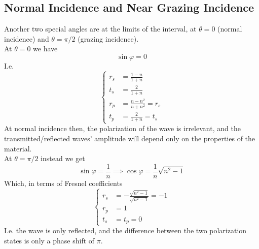 \documentclass[../electromagnetism.tex]{subfiles}
\begin{document}
\subsection{Normal Incidence and Near Grazing Incidence}
Another two special angles are at the limits of the interval, at $\theta=0$ (normal incidence) and $\theta=\pi/2$ (grazing incidence).\\
At $\theta=0$ we have
\begin{equation*}
	\sin\varphi=0
\end{equation*}
I.e.
\begin{equation}
	\left\{ \begin{aligned}
			r_s&= \frac{1-n}{1+n}\\
			t_s&= \frac{2}{1+n}\\
			r_p&= \frac{n-n^2}{n+n^2}=r_s\\
			t_p&= \frac{2}{1+n}=t_s
	\end{aligned}\right.
	\label{eq:normalinc.ref}
\end{equation}
At normal incidence then, the polarization of the wave is irrelevant, and the transmitted/reflected waves' amplitude will depend only on the properties of the material.\\
At $\theta=\pi/2$ instead we get
\begin{equation*}
	\sin\varphi=\frac{1}{n}\implies\cos\varphi=\frac{1}{n}\sqrt{n^2-1}
\end{equation*}
Which, in terms of Fresnel coefficients
\begin{equation}
	\left\{ \begin{aligned}
			r_s&= -\frac{\sqrt{n^2-1}}{\sqrt{n^2-1}}=-1\\
			r_p&= 1\\
			t_s&= t_p=0
	\end{aligned}\right.
	\label{eq:grazinginc.ref}
\end{equation}
I.e. the wave is only reflected, and the difference between the two polarization states is only a phase shift of $\pi$.
\end{document}
